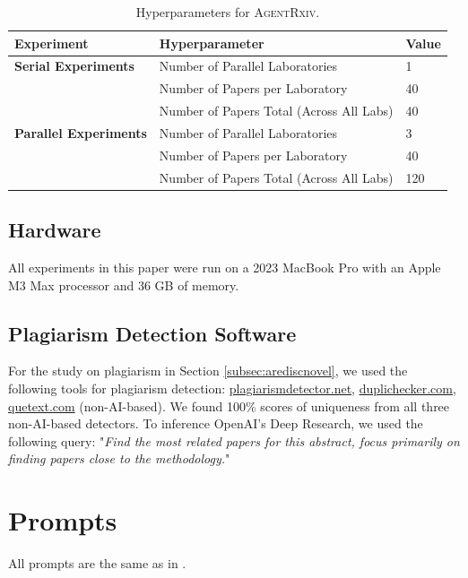 \documentclass[11pt, a4paper]{include/gdm_format}
\begin{document}
\begin{table}[h!]
\centering
\caption{Hyperparameters for \textsc{AgentRxiv}.}
\begin{tabular}{@{}lll@{}}
\toprule
\textbf{Experiment}        & \textbf{Hyperparameter}                          & \textbf{Value}       \\ \midrule
\textbf{Serial Experiments} &  Number of Parallel Laboratories & 1 \\ 
& Number of Papers per Laboratory & 40 \\ 
&  Number of Papers Total (Across All Labs) & 40 \\
\midrule
\textbf{Parallel Experiments}
&  Number of Parallel Laboratories & 3 \\ 

&  Number of Papers per Laboratory & 40 \\
 
&  Number of Papers Total (Across All Labs) & 120 \\
 \bottomrule
\end{tabular}
\end{table}




\subsection{Hardware}

All experiments in this paper were run on a 2023 MacBook Pro with an Apple M3 Max processor and 36 GB of memory.

\subsection{Plagiarism Detection Software}
\label{appendix:plagiarismdet}

For the study on plagiarism in Section \ref{subsec:arediscnovel}, we used the following tools for plagiarism detection: 
\href{https://plagiarismdetector.net}{plagiarismdetector.net}, \href{https://duplichecker.com}{duplichecker.com}, \href{https://quetext.com}{quetext.com} (non-AI-based). We found 100\% scores of uniqueness from all three non-AI-based detectors. To inference OpenAI's Deep Research, we used the following query: "\textit{Find the most related papers for this abstract, focus primarily on finding papers close to the methodology.}"


\section{Prompts}

All prompts are the same as in \cite{schmidgall2025agent}. 
\end{document}
